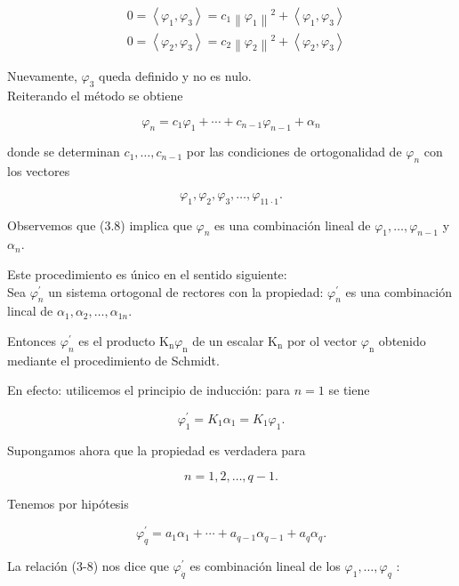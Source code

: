 \documentclass[10pt]{article}
\theoremstyle{plain}
\theoremstyle{definition}
\theoremstyle{remark}
\begin{document}
$$
\begin{aligned}
& 0=\left\langle\varphi_{1}, \varphi_{3}\right\rangle=c_{1}\left\|\varphi_{1}\right\|^{2}+\left\langle\varphi_{1}, \varphi_{3}\right\rangle \\
& 0=\left\langle\varphi_{2}, \varphi_{3}\right\rangle=c_{2}\left\|\varphi_{2}\right\|^{2}+\left\langle\varphi_{2}, \varphi_{3}\right\rangle
\end{aligned}
$$

Nuevamente, $\varphi_{3}$ queda definido y no es nulo.\\
Reiterando el método se obtiene


\begin{equation*}
\varphi_{n}=c_{1} \varphi_{1}+\cdots+c_{n-1} \varphi_{n-1}+\alpha_{n} \tag{3.8}
\end{equation*}


donde se determinan $c_{1}, \ldots, c_{n-1}$ por las condiciones de ortogonalidad de $\varphi_{n}$ con los vectores

$$
\varphi_{1}, \varphi_{2}, \varphi_{3}, \ldots, \varphi_{11 \cdot 1} .
$$

Observemos que (3.8) implica que $\varphi_{n}$ es una combinación lineal de $\varphi_{1}, \ldots, \varphi_{n-1}$ y $\alpha_{n}$.

Este procedimiento es único en el sentido siguiente:\\
Sea $\varphi_{n}^{\prime}$ un sistema ortogonal de rectores con la propiedad: $\varphi_{n}^{\prime}$ es una combinación lincal de $\alpha_{1}, \alpha_{2}, \ldots, \alpha_{1 n}$.

Entonces $\varphi_{n}^{\prime}$ es el producto $\mathrm{K}_{\mathrm{n}} \varphi_{\mathrm{n}}$ de un escalar $\mathrm{K}_{\mathrm{n}}$ por ol vector $\varphi_{\mathrm{n}}$ obtenido mediante el procedimiento de Schmidt.

En efecto: utilicemos el principio de inducción: para $n=1$ se tiene

$$
\varphi_{1}^{\prime}=K_{1} \alpha_{1}=K_{1} \varphi_{1} .
$$

Supongamos ahora que la propiedad es verdadera para

$$
n=1,2, \ldots, q-1 .
$$

Tenemos por hipótesis

$$
\varphi_{q}^{\prime}=a_{1} \alpha_{1}+\cdots+a_{q-1} \alpha_{q-1}+a_{q} \alpha_{q} .
$$

La relación (3-8) nos dice que $\varphi_{\dot{q}}^{\prime}$ es combinación lineal de los $\varphi_{1}, \ldots, \varphi_{q}$ :
\end{document}
